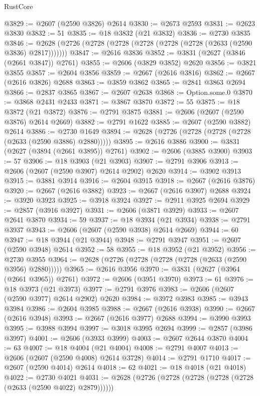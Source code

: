 \begin{lexlean}{RustCore}
\begin{coremodule}
@3829 := @2607 (@2590 @3826) @2614
@3830 := @2673 @2593
@3831 := @2623 @3830
@3832 := 51
@3835 := @18 @3832 (@21 @3832)
@3836 := @2730 @3835
@3846 := @2628 (@2726 (@2728 (@2728 (@2728 (@2728 (@2728 (@2633 (@2590 @3836) @2817)))))))
@3847 := @2616 @3836
@3852 := @3831 (@2627 (@3846 (@2661 @3847)) @2761)
@3855 := @2606 (@3829 @3852) @2620
@3856 := @3821 @3855
@3857 := @2604 @3856
@3859 := @2667 (@2616 @3816)
@3862 := @2667 (@2616 @3826) @2688
@3863 := @3859 @3862
@3865 := @2841 @3863 @2694
@3866 := @2837 @3865
@3867 := @2607 @2638
@3868 := Option.some.{0}
@3870 := @3868 @2431 @2433
@3871 := @3867 @3870
@3872 := 55
@3875 := @18 @3872 (@21 @3872)
@3876 := @2791 @3875
@3881 := @2606 (@2607 (@2590 @3876) @2614 @2669)
@3882 := @2791 @1622
@3885 := @2607 (@2590 @3882) @2614
@3886 := @2730 @1649
@3894 := @2628 (@2726 (@2728 (@2728 (@2728 (@2633 (@2590 @3886) @2880)))))
@3895 := @2616 @3886
@3900 := @3831 (@2627 (@3894 (@2661 @3895)) @2761)
@3902 := @2606 (@3885 @3900)
@3903 := 57
@3906 := @18 @3903 (@21 @3903)
@3907 := @2791 @3906
@3913 := @2606 (@2607 (@2590 @3907) @2614 @2902) @2620
@3914 := @3902 @3913
@3915 := @3881 @3914
@3916 := @2604 @3915
@3918 := @2667 (@2616 @3876)
@3920 := @2667 (@2616 @3882)
@3923 := @2667 (@2616 @3907) @2688
@3924 := @3920 @3923
@3925 := @3918 @3924
@3927 := @2911 @3925 @2694
@3929 := @2857 (@3916 @3927)
@3931 := @2606 (@3871 @3929)
@3933 := @2607 @2641 @3870
@3934 := 59
@3937 := @18 @3934 (@21 @3934)
@3938 := @2791 @3937
@3943 := @2606 (@2607 (@2590 @3938) @2614 @2669)
@3944 := 60
@3947 := @18 @3944 (@21 @3944)
@3948 := @2791 @3947
@3951 := @2607 (@2590 @3948) @2614
@3952 := 58
@3955 := @18 @3952 (@21 @3952)
@3956 := @2730 @3955
@3964 := @2628 (@2726 (@2728 (@2728 (@2728 (@2633 (@2590 @3956) @2880)))))
@3965 := @2616 @3956
@3970 := @3831 (@2627 (@3964 (@2661 @3965)) @2761)
@3972 := @2606 (@3951 @3970)
@3973 := 61
@3976 := @18 @3973 (@21 @3973)
@3977 := @2791 @3976
@3983 := @2606 (@2607 (@2590 @3977) @2614 @2902) @2620
@3984 := @3972 @3983
@3985 := @3943 @3984
@3986 := @2604 @3985
@3988 := @2667 (@2616 @3938)
@3990 := @2667 (@2616 @3948)
@3993 := @2667 (@2616 @3977) @2688
@3994 := @3990 @3993
@3995 := @3988 @3994
@3997 := @3018 @3995 @2694
@3999 := @2857 (@3986 @3997)
@4001 := @2606 (@3933 @3999)
@4003 := @2607 @2644 @3870
@4004 := 63
@4007 := @18 @4004 (@21 @4004)
@4008 := @2791 @4007
@4013 := @2606 (@2607 (@2590 @4008) @2614 @3728)
@4014 := @2791 @1710
@4017 := @2607 (@2590 @4014) @2614
@4018 := 62
@4021 := @18 @4018 (@21 @4018)
@4022 := @2730 @4021
@4031 := @2628 (@2726 (@2728 (@2728 (@2728 (@2728 (@2633 (@2590 @4022) @2879))))))

\end{coremodule}
\end{lexlean}
